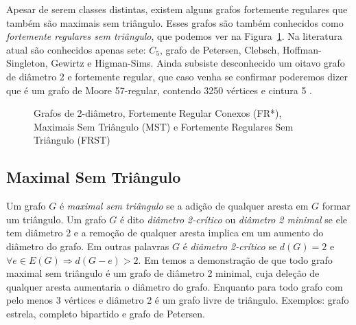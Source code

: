 Apesar de serem classes distintas, existem alguns grafos fortemente regulares que também são maximais sem triângulo.  Esses grafos são também conhecidos como \textit{fortemente regulares sem triângulo}, que podemos ver na Figura~\ref{figconjts}. Na literatura atual são conhecidos apenas sete: $C_5$, grafo de Petersen, Clebsch, Hoffman-Singleton, Gewirtz e Higman-Sims. Ainda subsiste desconhecido um oitavo grafo de diâmetro 2 e fortemente regular, que caso venha se confirmar poderemos dizer que é um grafo de Moore 57-regular, contendo 3250 vértices e cintura 5 \cite{Godsil1995}.

\begin{figure}[h]
    \centering
    \caption{Grafos de 2-diâmetro, Fortemente Regular Conexos (FR*), Maximais Sem Triângulo (MST) e Fortemente Regulares Sem Triângulo (FRST)}
    \label{figconjts}
\end{figure}

\subsection{Maximal Sem Triângulo}
\label{sec-mst}
Um grafo $G$ é \textit{maximal sem triângulo} se a adição de qualquer aresta em $G$
formar um triângulo. Um grafo $G$ é dito \textit{diâmetro 2-crítico} ou \textit{diâmetro 2 minimal}  se ele tem diâmetro 2 e a remoção de qualquer aresta implica em um aumento do diâmetro do grafo. Em outras palavras $G$ é \textit{diâmetro 2-crítico} se $d(G)=2$ e $\forall e\in E(G) \Rightarrow d(G-e)>2$.  Em \cite{Mathematics1995,Barefoot1995} temos a demonstração  de que todo grafo maximal sem triângulo é um grafo de diâmetro 2 minimal, cuja deleção de qualquer aresta aumentaria o diâmetro do grafo. Enquanto para \cite{Brandt2000} todo grafo com pelo menos 3 vértices e diâmetro 2 é um grafo livre de triângulo. Exemplos: grafo estrela, completo bipartido e grafo de Petersen. 




